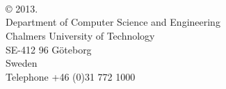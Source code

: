\begin{titlepage}
  \begin{flushleft}
    ~\\[2cm]
    \mytitle{}\\
    \myname{} \\[0.5cm]
    \copyright{} \myname{} 2013.\\[0.5cm]
    Department of Computer Science and Engineering\\
    Chalmers University of Technology\\
    SE-412 96 G\"{o}teborg\\
    Sweden\\
    Telephone +46 (0)31 772 1000
    
  \end{flushleft}
\end{titlepage}
